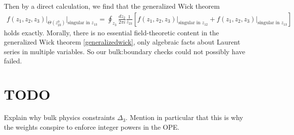 \documentclass[11pt,letterpaper]{article}
\begin{document}
Then by a direct calculation, we find that the generalized Wick theorem \begin{equation}
\begin{aligned}
f(z_1, z_2, z_3) \Big|_{\Theta(z_{23}^0)} \Big|_{\text{singular in }z_{13}} = \oint_{z_3} \frac{dz_2}{2 \pi i} \frac{1}{z_{23}} \left[f(z_1, z_2, z_3)\Big|_{\text{singular in }z_{12}} + f(z_1, z_2, z_3)\Big|_{\text{singular in }z_{13}}\right]
\end{aligned}
\end{equation}
holds exactly. Morally, there is no essential field-theoretic content in the generalized Wick theorem \eqref{generalizedwick}, only algebraic facts about Laurent series in multiple variables. So our bulk:boundary checks could not possibly have failed. 







\section{TODO}
Explain why bulk physics constraints $\Delta_3$. Mention in particular that this is why the weights conspire to enforce integer powers in the OPE.




\end{document}
